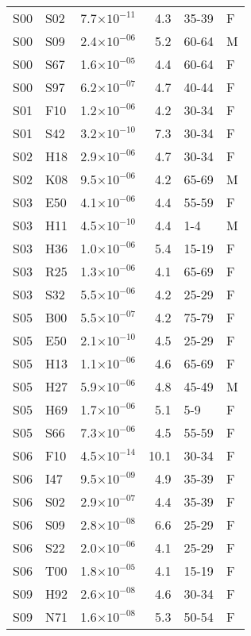 \begin{longtable}{lllrll}
   S00 & S02 & 7.7$\times10^{-11}$ & 4.3 & 35-39 & F \\ 
   S00 & S09 & 2.4$\times10^{-06}$ & 5.2 & 60-64 & M \\ 
   S00 & S67 & 1.6$\times10^{-05}$ & 4.4 & 60-64 & F \\ 
   S00 & S97 & 6.2$\times10^{-07}$ & 4.7 & 40-44 & F \\ 
   S01 & F10 & 1.2$\times10^{-06}$ & 4.2 & 30-34 & F \\ 
   S01 & S42 & 3.2$\times10^{-10}$ & 7.3 & 30-34 & F \\ 
   S02 & H18 & 2.9$\times10^{-06}$ & 4.7 & 30-34 & F \\ 
   S02 & K08 & 9.5$\times10^{-06}$ & 4.2 & 65-69 & M \\ 
   S03 & E50 & 4.1$\times10^{-06}$ & 4.4 & 55-59 & F \\ 
   S03 & H11 & 4.5$\times10^{-10}$ & 4.4 & 1-4 & M \\ 
   S03 & H36 & 1.0$\times10^{-06}$ & 5.4 & 15-19 & F \\ 
   S03 & R25 & 1.3$\times10^{-06}$ & 4.1 & 65-69 & F \\ 
   S03 & S32 & 5.5$\times10^{-06}$ & 4.2 & 25-29 & F \\ 
   S05 & B00 & 5.5$\times10^{-07}$ & 4.2 & 75-79 & F \\ 
   S05 & E50 & 2.1$\times10^{-10}$ & 4.5 & 25-29 & F \\ 
   S05 & H13 & 1.1$\times10^{-06}$ & 4.6 & 65-69 & F \\ 
   S05 & H27 & 5.9$\times10^{-06}$ & 4.8 & 45-49 & M \\ 
   S05 & H69 & 1.7$\times10^{-06}$ & 5.1 & 5-9 & F \\ 
   S05 & S66 & 7.3$\times10^{-06}$ & 4.5 & 55-59 & F \\ 
   S06 & F10 & 4.5$\times10^{-14}$ & 10.1 & 30-34 & F \\ 
   S06 & I47 & 9.5$\times10^{-09}$ & 4.9 & 35-39 & F \\ 
   S06 & S02 & 2.9$\times10^{-07}$ & 4.4 & 35-39 & F \\ 
   S06 & S09 & 2.8$\times10^{-08}$ & 6.6 & 25-29 & F \\ 
   S06 & S22 & 2.0$\times10^{-06}$ & 4.1 & 25-29 & F \\ 
   S06 & T00 & 1.8$\times10^{-05}$ & 4.1 & 15-19 & F \\ 
   S09 & H92 & 2.6$\times10^{-08}$ & 4.6 & 30-34 & F \\ 
   S09 & N71 & 1.6$\times10^{-08}$ & 5.3 & 50-54 & F \\ 

\end{longtable}
